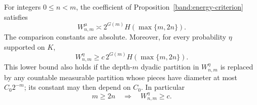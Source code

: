 \begin{lemma}
\label{curvatureobs:formula}
For integers \(0\le n<m\), the coefficient of
Proposition~\ref{band:energy-criterion} satisfies
\begin{equation}\label{curvatureobs:exact}
 W^\mu_{n,m}\asymp
 2^{G(m)}H(\max\{m,2n\}).
\end{equation}
The comparison constants are absolute.
Moreover, for every probability \(\eta\) supported on \(K\),
\begin{equation}\label{curvatureobs:allsource}
 W^\eta_{n,m}\ge c\,2^{G(m)}H(\max\{m,2n\}).
\end{equation}
This lower bound also holds if the depth-\(m\) dyadic partition in
\(W^\eta_{n,m}\) is replaced by any countable measurable partition
whose pieces have diameter at most \(C_0 2^{-m}\); its constant may
then depend on \(C_0\). In particular
\begin{equation}\label{curvatureobs:longjump}
 m\ge2n\quad\Longrightarrow\quad W^\eta_{n,m}\ge c.
\end{equation}
\end{lemma}
